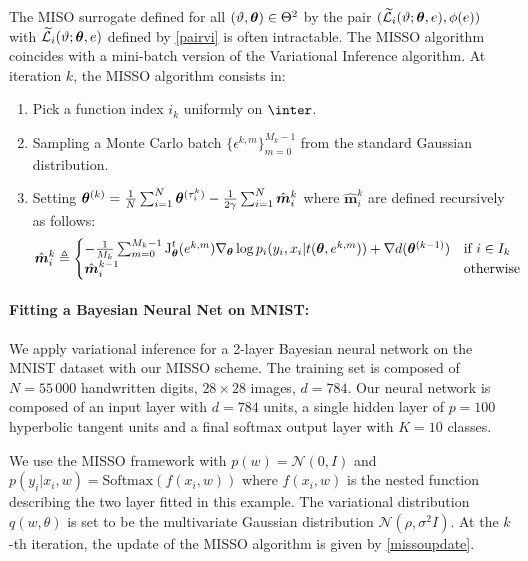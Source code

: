 \documentclass[11pt]{article}
\theoremstyle{t}
\begin{document}
The MISO surrogate defined for all $(\vartheta, {\bm{\theta}}) \in \Theta^2$ by the pair $(\ssur{i}{\vartheta}{\param}{e},\phi(e))$ with $\ssur{i}{\vartheta}{\param}{e}$ defined by \eqref{pairvi} is often intractable. 
The MISSO algorithm coincides with a mini-batch version of the Variational Inference algorithm. At iteration $k$, the MISSO algorithm consists in:
\begin{enumerate}
    \item Pick a function index $i_k$ uniformly on $\inter$.
    \item Sampling a Monte Carlo batch $\{\epsilon^{k,m}\}_{m=0}^{M_k-1}$ from the standard Gaussian distribution.
    \item Setting ${{\bm{\theta}}}^{(k)} = \frac{1}{N}\sum_{i=1}^{N}{{{\bm{\theta}}}^{(\tau_{i}^{k})}} - \frac{1}{2 \gamma} \sum_{i=1}^{N}{\hat{{\bm{m}}}^k_i}$ where $\hat{{\bm{m}}}^k_i$ are defined recursively as follows:
\begin{align}\label{missoupdate}
 \hat{{\bm{m}}}^k_i &\triangleq
  \begin{cases}
  - \frac{1}{M_k}\sum_{m=0}^{M_k-1}{ \operatorname{J}_{{\bm{\theta}}}^{t} (e^{k,m})\nabla_{{\bm{\theta}}} \log p_i(y_i,x_i|t({\bm{\theta}},e^{k,m}))} + \nabla d({{\bm{\theta}}}^{(k-1)})     & \text{if } i \in I_k \\
  \hat{{\bm{m}}}^{k-1}_{i}         & \text{otherwise}
  \end{cases}
\end{align}
\end{enumerate}

\paragraph{Fitting a Bayesian Neural Net on MNIST:}
We apply variational inference for a 2-layer Bayesian neural network on the MNIST dataset \citep{lecun1998gradient} with our MISSO scheme. The training set is composed of $N=55\,000$ handwritten digits, $28 \times 28$ images, $d=784$.
Our neural network is composed of an input layer with $d=784$ units, a single hidden layer of $p=100$ hyperbolic tangent units and a final softmax output layer with $K=10$ classes.

We use the MISSO framework with $p(w) = \mathcal{N}(0,I)$ and $p(y_i|x_i,w) = \textrm{Softmax}(f(x_i,w))$ where $f(x_i,w)$ is the nested function describing the two layer fitted in this example. 
The variational distribution $q(w,\theta)$ is set to be the multivariate Gaussian distribution $\mathcal{N}(\rho, \sigma^2 I)$. At the $k$-th iteration, the update of the MISSO algorithm is given by \eqref{missoupdate}.
\end{document}
